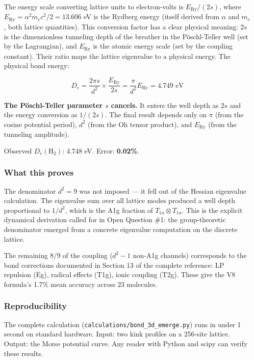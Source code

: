 \documentclass[
]{article}
\begin{document}
The energy scale converting lattice units to electron-volts is
\(E_{\text{Ry}} / (2s)\), where
\(E_{\text{Ry}} = \alpha^2 m_e c^2 / 2 = 13.606\) eV is the Rydberg
energy (itself derived from \(\alpha\) and \(m_e\), both lattice
quantities). This conversion factor has a clear physical meaning: \(2s\)
is the dimensionless tunneling depth of the breather in the
Pöschl-Teller well (set by the Lagrangian), and \(E_{\text{Ry}}\) is the
atomic energy scale (set by the coupling constant). Their ratio maps the
lattice eigenvalue to a physical energy. The physical bond energy:

\[D_e = \frac{2\pi s}{d^2} \times \frac{E_{\text{Ry}}}{2s} = \frac{\pi}{d^2} E_{\text{Ry}} = 4.749 \text{ eV}\]

\textbf{The Pöschl-Teller parameter \(s\) cancels.} It enters the well
depth as \(2s\) and the energy conversion as \(1/(2s)\). The final
result depends only on \(\pi\) (from the cosine potential period),
\(d^2\) (from the Oh tensor product), and \(E_{\text{Ry}}\) (from the
tunneling amplitude).

Observed \(D_e(\text{H}_2)\): 4.748 eV. Error: \textbf{0.02\%}.

\subsubsection{What this proves}\label{what-this-proves}

The denominator \(d^2 = 9\) was not imposed --- it fell out of the
Hessian eigenvalue calculation. The eigenvalue sum over all lattice
modes produced a well depth proportional to \(1/d^2\), which is the A1g
fraction of \(T_{1u} \otimes T_{1u}\). This is the explicit dynamical
derivation called for in Open Question \#1: the group-theoretic
denominator emerged from a concrete eigenvalue computation on the
discrete lattice.

The remaining 8/9 of the coupling (\(d^2-1\) non-A1g channels)
corresponds to the bond corrections documented in Section 13 of the
complete reference: LP repulsion (Eg), radical effects (T1g), ionic
coupling (T2g). These give the V8 formula's 1.7\% mean accuracy across
23 molecules.

\subsubsection{Reproducibility}\label{reproducibility}

The complete calculation (\texttt{calculations/bond\_3d\_emerge.py})
runs in under 1 second on standard hardware. Input: two kink profiles on
a 256-site lattice. Output: the Morse potential curve. Any reader with
Python and scipy can verify these results.
\end{document}
